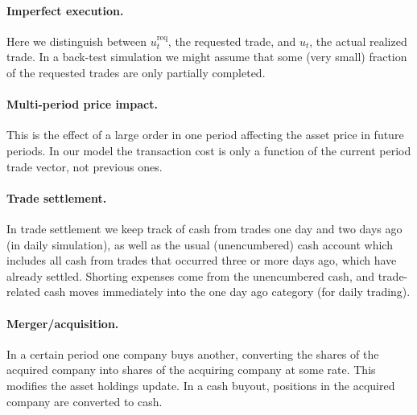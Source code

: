 \documentclass[openany]{now}
\begin{document}
\paragraph{Imperfect execution.}  Here we distinguish between $u^\mathrm{req}_t$,
the requested trade, and $u_t$, the actual realized trade.
In a back-test simulation we might assume that some
(very small) fraction of the requested trades are only partially completed.

\paragraph{Multi-period price impact.}
This is the effect of a
large order in one period affecting the asset price in future periods.
In our model the transaction cost is only a function of the current
period trade vector, not previous ones.

\paragraph{Trade settlement.}
In trade settlement we keep track of cash from trades one day and two days
ago (in daily simulation),
as well as the usual (unencumbered) cash account
which includes all cash from trades that occurred three or more
days ago, which have already settled.
Shorting expenses come from the unencumbered cash, and trade-related
cash moves immediately into the one day ago category (for daily trading).



\paragraph{Merger/acquisition.}
In a certain period one company buys another, converting the
shares of the acquired
company into shares of the acquiring company at some rate.
This modifies the asset holdings update.  In a cash buyout, positions in the
acquired company are converted to cash.
\end{document}
